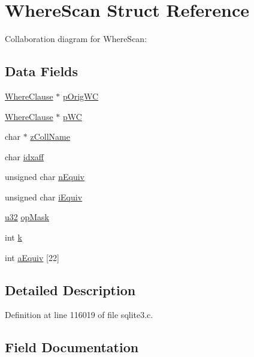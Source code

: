 \hypertarget{struct_where_scan}{}\section{Where\+Scan Struct Reference}
\label{struct_where_scan}


Collaboration diagram for Where\+Scan\+:
\subsection*{Data Fields}
\begin{DoxyCompactItemize}
\item 
\hyperlink{struct_where_clause}{Where\+Clause} $\ast$ \hyperlink{struct_where_scan_aec9c4ddcc3c94fc133c71da9eeec5a89}{p\+Orig\+W\+C}
\item 
\hyperlink{struct_where_clause}{Where\+Clause} $\ast$ \hyperlink{struct_where_scan_ab85657232a3c235326f1e0dd179e32b7}{p\+W\+C}
\item 
char $\ast$ \hyperlink{struct_where_scan_a5b5fdc17a3a1da384ba0cb3f91772038}{z\+Coll\+Name}
\item 
char \hyperlink{struct_where_scan_ae76475c448181af3447663ec3bd7a380}{idxaff}
\item 
unsigned char \hyperlink{struct_where_scan_a6d050bc5818a694ffb5e5dda5e3b90e0}{n\+Equiv}
\item 
unsigned char \hyperlink{struct_where_scan_a4782a4c73d7d506bec711fb2f9cdf038}{i\+Equiv}
\item 
\hyperlink{sqlite3_8c_a03ad5adfaeb9b7640dde78a0cc390319}{u32} \hyperlink{struct_where_scan_a843050c5a17d7b88b9f97b3a0e42c2af}{op\+Mask}
\item 
int \hyperlink{struct_where_scan_ab66ed8e0098c0a86b458672a55a9cca9}{k}
\item 
int \hyperlink{struct_where_scan_a23dc4d28864a6415c3fe5c438aeca8a0}{a\+Equiv} \mbox{[}22\mbox{]}
\end{DoxyCompactItemize}


\subsection{Detailed Description}


Definition at line 116019 of file sqlite3.\+c.



\subsection{Field Documentation}
\hypertarget{struct_where_scan_a23dc4d28864a6415c3fe5c438aeca8a0}{}
